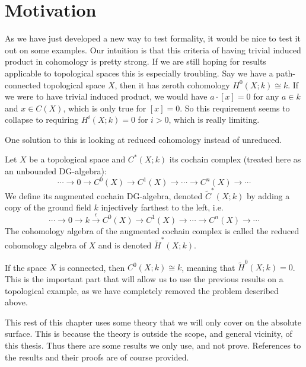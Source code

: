
\section{Motivation}

As we have just developed a new way to test formality, it would be nice to test it out on some examples. Our intuition is that this criteria of having trivial induced product in cohomology is pretty strong. If we are still hoping for results applicable to topological spaces this is especially troubling. Say we have a path-connected topological space $X$, then it has zeroth cohomology $H^0(X;k)\cong k$. If we were to have trivial induced product, we would have $a\cdot [x] = 0$ for any $a\in k$ and $x\in C(X)$, which is only true for $[x]=0$. So this requirement seems to collapse to requiring $H^i(X;k)=0$ for $i>0$, which is really limiting. 

One solution to this is looking at reduced cohomology instead of unreduced. 

\begin{definition}
Let $X$ be a topological space and $C^*(X;k)$ its cochain complex (treated here as an unbounded DG-algebra):
\begin{equation*}
    \cdots \to 0 \to C^0(X)\to C^1(X) \to \cdots \to C^n(X) \to \cdots 
\end{equation*}
We define its augmented cochain DG-algebra, denoted $\widetilde{C}^*(X;k)$ by adding a copy of the ground field $k$ injectively farthest to the left, i.e. 
\begin{equation*}
    \cdots \to 0 \to k \overset{\epsilon}\to C^0(X)\to C^1(X) \to \cdots \to C^n(X) \to \cdots 
\end{equation*}
The cohomology algebra of the augmented cochain complex is called the reduced cohomology algebra of $X$ and is denoted $\widetilde{H}^*(X;k)$.
\end{definition}

If the space $X$ is connected, then $C^0(X;k)\cong k$, meaning that $\widetilde{H}^0(X;k)=0$. This is the important part that will allow us to use the previous results on a topological example, as we have completely removed the problem described above. 

\begin{remark}
This rest of this chapter uses some theory that we will only cover on the absolute surface. This is because the theory is outside the scope, and general vicinity, of this thesis. Thus there are some results we only use, and not prove. References to the results and their proofs are of course provided. 
\end{remark}

